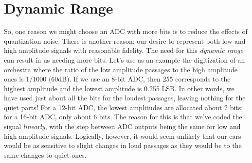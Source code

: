 

\section{Dynamic Range}

So, one reason we might choose an ADC with more bits is to reduce the
effects of quantization noise.  There is another reason: our desire to
represent both low and high amplitude signals with reasonable
fidelity. The need for this \emph{dynamic range} can result in us
needing more bits.  Let's use as an example the digitization of an
orchestra where the ratio of the low amplitude passages to the high
amplitude ones is 1/1000 (60dB).  If we use an 8-bit ADC, then 255
corresponds to the highest amplitude and the lowest amplitude is 0.255
LSB. In other words, we have used just about all the bits for the
loudest passages, leaving nothing for the quiet parts!  For a 12-bit
ADC, the lowest amplitudes are allocated about 2 bits; for a 16-bit
ADC, only about 6 bits. The reason for this is that we've coded the
signal \emph{linearly}, with the step between ADC outputs being the
same for low and high amplitude signals. Logically, however, it would
seem unlikely that our ears would be as sensitive to slight changes in
loud passages as they would be to the same changes to quiet ones.

